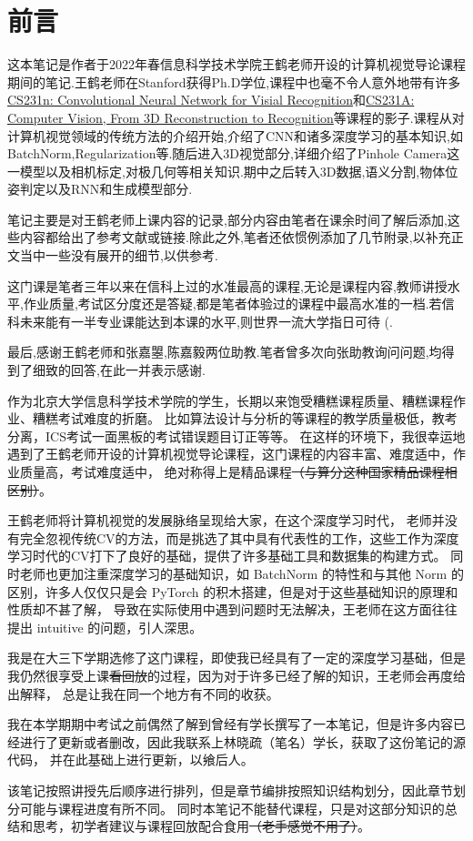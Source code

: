 \section*{前言}

这本笔记是作者于2022年春信息科学技术学院王鹤老师开设的计算机视觉导论课程期间的笔记.王鹤老师在Stanford获得Ph.D学位,课程中也毫不令人意外地带有许多\href{https://cs231n.github.io/}{CS231n: Convolutional Neural Network for Visial Recognition}和\href{https://web.stanford.edu/class/cs231a/course_notes.html}{CS231A: Computer Vision, From 3D Reconstruction to Recognition}等课程的影子.课程从对计算机视觉领域的传统方法的介绍开始,介绍了CNN和诸多深度学习的基本知识,如BatchNorm,Regularization等.随后进入3D视觉部分,详细介绍了Pinhole Camera这一模型以及相机标定,对极几何等相关知识.期中之后转入3D数据,语义分割,物体位姿判定以及RNN和生成模型部分.

笔记主要是对王鹤老师上课内容的记录,部分内容由笔者在课余时间了解后添加,这些内容都给出了参考文献或链接.除此之外,笔者还依惯例添加了几节附录,以补充正文当中一些没有展开的细节,以供参考.

这门课是笔者三年以来在信科上过的水准最高的课程,无论是课程内容,教师讲授水平,作业质量,考试区分度还是答疑,都是笔者体验过的课程中最高水准的一档.若信科未来能有一半专业课能达到本课的水平,则世界一流大学指日可待 (.

最后,感谢王鹤老师和张嘉曌,陈嘉毅两位助教.笔者曾多次向张助教询问问题,均得到了细致的回答,在此一并表示感谢.



作为北京大学信息科学技术学院的学生，长期以来饱受糟糕课程质量、糟糕课程作业、糟糕考试难度的折磨。
比如算法设计与分析的等课程的教学质量极低，教考分离，ICS考试一面黑板的考试错误题目订正等等。
在这样的环境下，我很幸运地遇到了王鹤老师开设的计算机视觉导论课程，这门课程的内容丰富、难度适中，作业质量高，考试难度适中，
绝对称得上是精品课程\sout{（与算分这种国家精品课程相区别）}。

王鹤老师将计算机视觉的发展脉络呈现给大家，在这个深度学习时代，
老师并没有完全忽视传统CV的方法，而是挑选了其中具有代表性的工作，这些工作为深度学习时代的CV打下了良好的基础，提供了许多基础工具和数据集的构建方式。
同时老师也更加注重深度学习的基础知识，如 BatchNorm 的特性和与其他 Norm 的区别，许多人仅仅只是会 PyTorch 的积木搭建，但是对于这些基础知识的原理和性质却不甚了解，
导致在实际使用中遇到问题时无法解决，王老师在这方面往往提出 intuitive 的问题，引人深思。

我是在大三下学期选修了这门课程，即使我已经具有了一定的深度学习基础，但是我仍然很享受上课\sout{看回放}的过程，因为对于许多已经了解的知识，王老师会再度给出解释，
总是让我在同一个地方有不同的收获。

我在本学期期中考试之前偶然了解到曾经有学长撰写了一本笔记，但是许多内容已经进行了更新或者删改，因此我联系上林晓疏（笔名）学长，获取了这份笔记的源代码，
并在此基础上进行更新，以飨后人。

该笔记按照讲授先后顺序进行排列，但是章节编排按照知识结构划分，因此章节划分可能与课程进度有所不同。
同时本笔记不能替代课程，只是对这部分知识的总结和思考，初学者建议与课程回放配合食用\sout{（老手感觉不用了）}。


